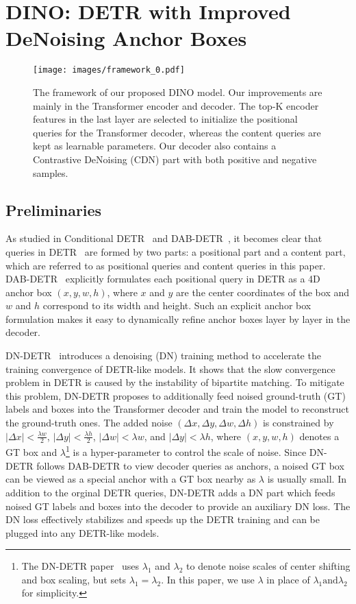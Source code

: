 \documentclass[runningheads]{llncs}
\newcommand{\modelname}{{DINO}}
\begin{document}
\section{\modelname: {D}ETR with {I}mproved De{N}oising Anchor Boxes}
\label{sec:method}
\begin{figure}[h]
\texttt{[image: images/framework\_0.pdf]}
    \centering
    \vspace{-0.5cm}
    \caption{The framework of our proposed DINO model. Our improvements are mainly in the Transformer encoder and decoder. The top-K encoder features in the last layer are selected to initialize the positional queries for the Transformer decoder, whereas the content queries are kept as learnable parameters. Our decoder also contains a Contrastive DeNoising (CDN) part with both positive and negative samples. }
    \label{fig:framework}
\end{figure} \subsection{Preliminaries}\label{sec:preliminary}
As studied in Conditional DETR~\cite{meng2021conditional} and DAB-DETR~\cite{liu2022dab}, it becomes clear that queries in DETR~\cite{carion2020end} are formed by two parts: a positional part and a content part, which are referred to as positional queries and content queries in this paper. 
DAB-DETR~\cite{liu2022dab} explicitly formulates each positional query in DETR as a 4D anchor box $(x,y,w,h)$, where $x$ and $y$ are the center coordinates of the box and $w$ and $h$ correspond to its width and height. Such an explicit anchor box formulation makes it easy to dynamically refine anchor boxes layer by layer in the decoder.

DN-DETR~\cite{li2022dn} introduces a denoising (DN) training method to accelerate the training convergence of DETR-like models. It shows that the slow convergence problem in DETR is caused by the instability of bipartite matching. To mitigate this problem, DN-DETR proposes to additionally feed noised ground-truth (GT) labels and boxes into the Transformer decoder and train the model to reconstruct the ground-truth ones. The added noise $(\Delta x, \Delta y, \Delta w, \Delta h)$ is constrained by $|\Delta x|<\frac{\lambda w}{2}$, $|\Delta y|<\frac{\lambda h}{2}$, $|\Delta w|<\lambda w$, and $|\Delta y|<\lambda h$, where $(x,y,w,h)$ denotes a GT box and $\lambda$\footnote{The DN-DETR paper~\cite{li2022dn} uses $\lambda_1$ and $\lambda_2$ to denote noise scales of center shifting and box scaling, but sets $\lambda_1 =\lambda_2$. In this paper, we use $\lambda$ in place of $\lambda_1 \text{and} \lambda_2$ for simplicity.} is a hyper-parameter to control the scale of noise. Since DN-DETR follows DAB-DETR to view decoder queries as anchors, a noised GT box can be viewed as a special anchor with a GT box nearby as $\lambda$ is usually small. In addition to the orginal DETR queries, DN-DETR adds a DN part which feeds noised GT labels and boxes into the decoder to provide an auxiliary DN loss. The DN loss effectively stabilizes and speeds up the DETR training and can be plugged into any DETR-like models. 
\end{document}
